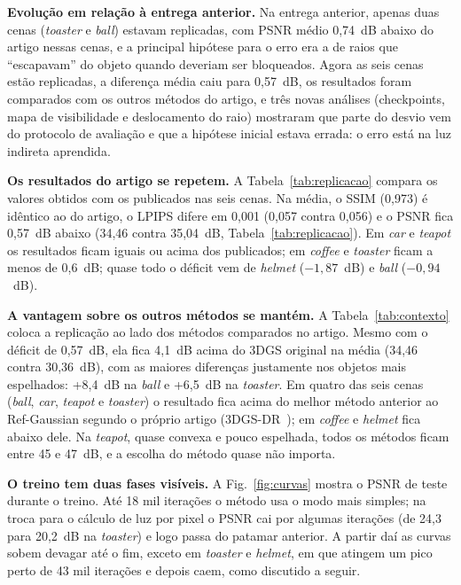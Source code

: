 \documentclass[conference]{IEEEtran}
\begin{document}
\textbf{Evolução em relação à entrega anterior.} Na entrega anterior, apenas duas cenas (\textit{toaster} e \textit{ball}) estavam replicadas, com PSNR médio 0,74~dB abaixo do artigo nessas cenas, e a principal hipótese para o erro era a de raios que ``escapavam'' do objeto quando deveriam ser bloqueados. Agora as seis cenas estão replicadas, a diferença média caiu para 0,57~dB, os resultados foram comparados com os outros métodos do artigo, e três novas análises (checkpoints, mapa de visibilidade e deslocamento do raio) mostraram que parte do desvio vem do protocolo de avaliação e que a hipótese inicial estava errada: o erro está na luz indireta aprendida.

\textbf{Os resultados do artigo se repetem.} A Tabela~\ref{tab:replicacao} compara os valores obtidos com os publicados nas seis cenas. Na média, o SSIM (0,973) é idêntico ao do artigo, o LPIPS difere em 0,001 (0,057 contra 0,056) e o PSNR fica 0,57~dB abaixo (34,46 contra 35,04~dB, Tabela~\ref{tab:replicacao}). Em \textit{car} e \textit{teapot} os resultados ficam iguais ou acima dos publicados; em \textit{coffee} e \textit{toaster} ficam a menos de 0,6~dB; quase todo o déficit vem de \textit{helmet} ($-1{,}87$~dB) e \textit{ball} ($-0{,}94$~dB).

\textbf{A vantagem sobre os outros métodos se mantém.} A Tabela~\ref{tab:contexto} coloca a replicação ao lado dos métodos comparados no artigo. Mesmo com o déficit de 0,57~dB, ela fica 4,1~dB acima do 3DGS original na média (34,46 contra 30,36~dB), com as maiores diferenças justamente nos objetos mais espelhados: +8,4~dB na \textit{ball} e +6,5~dB na \textit{toaster}. Em quatro das seis cenas (\textit{ball}, \textit{car}, \textit{teapot} e \textit{toaster}) o resultado fica acima do melhor método anterior ao Ref-Gaussian segundo o próprio artigo (3DGS-DR~\cite{ye2024dr}); em \textit{coffee} e \textit{helmet} fica abaixo dele. Na \textit{teapot}, quase convexa e pouco espelhada, todos os métodos ficam entre 45 e 47~dB, e a escolha do método quase não importa.

\textbf{O treino tem duas fases visíveis.} A Fig.~\ref{fig:curvas} mostra o PSNR de teste durante o treino. Até 18 mil iterações o método usa o modo mais simples; na troca para o cálculo de luz por pixel o PSNR cai por algumas iterações (de 24,3 para 20,2~dB na \textit{toaster}) e logo passa do patamar anterior. A partir daí as curvas sobem devagar até o fim, exceto em \textit{toaster} e \textit{helmet}, em que atingem um pico perto de 43 mil iterações e depois caem, como discutido a seguir.
\end{document}
